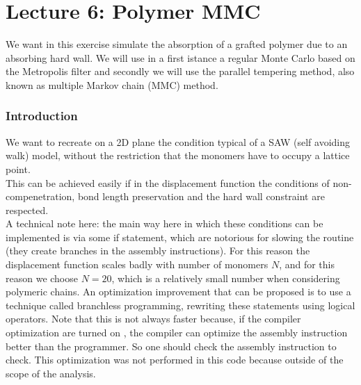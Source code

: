 \chapter*{Lecture 6: Polymer MMC}

We want in this exercise simulate the absorption of a grafted polymer due to an absorbing hard wall. We will use in a first 
istance a regular Monte Carlo based on the Metropolis filter and secondly we will use the parallel tempering method, also known as 
multiple Markov chain (MMC) method.

\subsection*{Introduction}

We want to recreate on a 2D plane the condition typical of a SAW (self avoiding walk) model,  without the restriction that the monomers have to 
occupy a lattice point. \\
This can be achieved easily if in the displacement function the conditions of non-compenetration, bond length preservation and the hard wall constraint are respected. \\

A technical note here: the main way here in which these conditions can be implemented is via some if statement, which are notorious for slowing the routine 
(they create branches in the assembly instructions). For this reason the displacement function scales badly with number of monomers $N$, and for this reason we choose $N=20$, which is a relatively small number 
when considering polymeric chains. An optimization improvement that can be proposed is to use a technique called branchless programming, rewriting
these statements using logical operators. Note that this is not always faster because, if the compiler optimization are turned on , the compiler can
optimize the assembly instruction better than the programmer. So one should check the assembly instruction to check. This optimization was not performed in this code 
because outside of the scope of the analysis. \\

